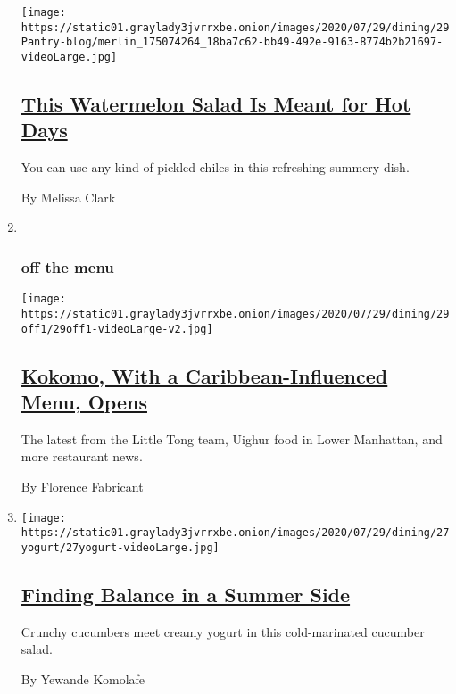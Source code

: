 \begin{enumerate}
  \texttt{[image: https://static01.graylady3jvrrxbe.onion/images/2020/07/29/dining/29Pantry-blog/merlin\_175074264\_18ba7c62-bb49-492e-9163-8774b2b21697-videoLarge.jpg]}

  \hypertarget{this-watermelon-salad-is-meant-for-hot-days}{%
  \subsection{\texorpdfstring{\href{/2020/07/29/dining/watermelon-salad-recipe.html}{This
  Watermelon Salad Is Meant for Hot
  Days}}{This Watermelon Salad Is Meant for Hot Days}}\label{this-watermelon-salad-is-meant-for-hot-days}}

  You can use any kind of pickled chiles in this refreshing summery
  dish.

  By Melissa Clark
\item ~
  \hypertarget{off-the-menu}{%
  \subsubsection{off the menu}\label{off-the-menu}}

  \texttt{[image: https://static01.graylady3jvrrxbe.onion/images/2020/07/29/dining/29off1/29off1-videoLarge-v2.jpg]}

  \hypertarget{kokomo-with-a-caribbean-influenced-menu-opens}{%
  \subsection{\texorpdfstring{\href{/2020/07/28/dining/nyc-restaurant-news.html}{Kokomo,
  With a Caribbean-Influenced Menu,
  Opens}}{Kokomo, With a Caribbean-Influenced Menu, Opens}}\label{kokomo-with-a-caribbean-influenced-menu-opens}}

  The latest from the Little Tong team, Uighur food in Lower Manhattan,
  and more restaurant news.

  By Florence Fabricant
\item
  \texttt{[image: https://static01.graylady3jvrrxbe.onion/images/2020/07/29/dining/27yogurt/27yogurt-videoLarge.jpg]}

  \hypertarget{finding-balance-in-a-summer-side}{%
  \subsection{\texorpdfstring{\href{/2020/07/27/dining/cucumbers-yogurt-recipe.html}{Finding
  Balance in a Summer
  Side}}{Finding Balance in a Summer Side}}\label{finding-balance-in-a-summer-side}}

  Crunchy cucumbers meet creamy yogurt in this cold-marinated cucumber
  salad.

  By Yewande Komolafe
\end{enumerate}

